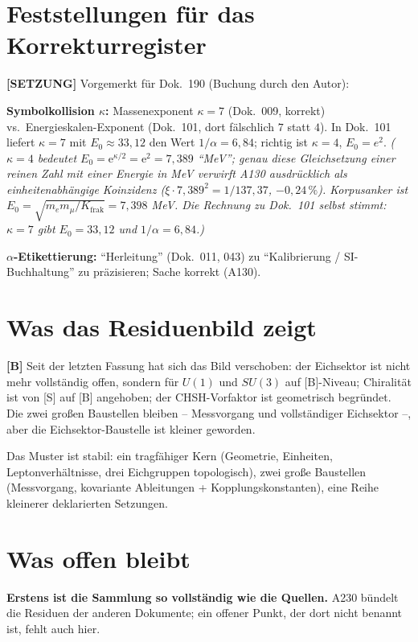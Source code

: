 \section{Feststellungen für das Korrekturregister}

\textbf{[SETZUNG]} Vorgemerkt für Dok.~190 (Buchung durch den Autor):

\textbf{Symbolkollision $\kappa$:} Massenexponent $\kappa=7$ (Dok.~009, korrekt)
vs.\ Energieskalen-Exponent (Dok.~101, dort fälschlich $7$ statt $4$). In
Dok.~101 liefert $\kappa=7$ mit $E_0\approx33{,}12$ den Wert $1/\alpha=6{,}84$;
richtig ist $\kappa=4$, $E_0=e^2$. \textit{($\kappa=4$ bedeutet $E_0=\mathrm{e}^{\kappa/2}=\mathrm{e}^2=7{,}389$ \enquote{MeV}; genau diese Gleichsetzung einer reinen Zahl mit einer Energie in MeV verwirft A130 ausdrücklich als einheitenabhängige Koinzidenz ($\xi\cdot7{,}389^2=1/137{,}37$, $-0{,}24\,\%$). Korpusanker ist $E_0=\sqrt{m_em_\mu/K_\text{frak}}=7{,}398$ MeV. Die Rechnung zu Dok.~101 selbst stimmt: $\kappa=7$ gibt $E_0=33{,}12$ und $1/\alpha=6{,}84$.)}

\textbf{$\alpha$-Etikettierung:} \enquote{Herleitung} (Dok.~011, 043) zu
\enquote{Kalibrierung / SI-Buchhaltung} zu präzisieren; Sache korrekt (A130).

\section{Was das Residuenbild zeigt}

\textbf{[B]} Seit der letzten Fassung hat sich das Bild verschoben: der
Eichsektor ist nicht mehr vollständig offen, sondern für $U(1)$ und $SU(3)$
auf [B]-Niveau; Chiralität ist von [S] auf [B] angehoben; der CHSH-Vorfaktor
ist geometrisch begründet. Die zwei großen Baustellen bleiben -- Messvorgang
und vollständiger Eichsektor --, aber die Eichsektor-Baustelle ist kleiner
geworden.

Das Muster ist stabil: ein tragfähiger Kern (Geometrie, Einheiten,
Leptonverhältnisse, drei Eichgruppen topologisch), zwei große Baustellen
(Messvorgang, kovariante Ableitungen + Kopplungskonstanten), eine Reihe
kleinerer deklarierten Setzungen.

\section{Was offen bleibt}

\textbf{Erstens ist die Sammlung so vollständig wie die Quellen.} A230 bündelt
die Residuen der anderen Dokumente; ein offener Punkt, der dort nicht benannt
ist, fehlt auch hier.

